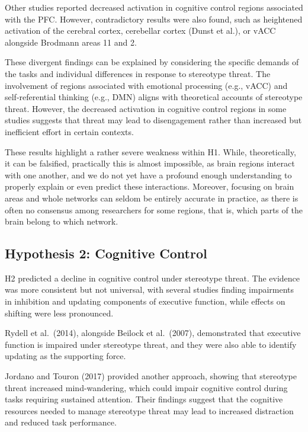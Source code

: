 \documentclass[
  stu, a4paper,floatsintext]{apa7}
\begin{document}
Other studies reported decreased activation in cognitive control regions associated with the PFC. However, contradictory results were also found, such as heightened activation of the cerebral cortex, cerebellar cortex (Dunst et al.), or vACC alongside Brodmann areas 11 and 2.

These divergent findings can be explained by considering the specific demands of the tasks and individual differences in response to stereotype threat. The involvement of regions associated with emotional processing (e.g., vACC) and self-referential thinking (e.g., DMN) aligns with theoretical accounts of stereotype threat. However, the decreased activation in cognitive control regions in some studies suggests that threat may lead to disengagement rather than increased but inefficient effort in certain contexts.

These results highlight a rather severe weakness within H1. While, theoretically, it can be falsified, practically this is almost impossible, as brain regions interact with one another, and we do not yet have a profound enough understanding to properly explain or even predict these interactions. Moreover, focusing on brain areas and whole networks can seldom be entirely accurate in practice, as there is often no consensus among researchers for some regions, that is, which parts of the brain belong to which network.

\subsection{Hypothesis 2: Cognitive Control}\label{hypothesis-2-cognitive-control}

H2 predicted a decline in cognitive control under stereotype threat. The evidence was more consistent but not universal, with several studies finding impairments in inhibition and updating components of executive function, while effects on shifting were less pronounced.

Rydell et al.~(2014), alongside Beilock et al.~(2007), demonstrated that executive function is impaired under stereotype threat, and they were also able to identify updating as the supporting force.

Jordano and Touron (2017) provided another approach, showing that stereotype threat increased mind-wandering, which could impair cognitive control during tasks requiring sustained attention. Their findings suggest that the cognitive resources needed to manage stereotype threat may lead to increased distraction and reduced task performance.
\end{document}
